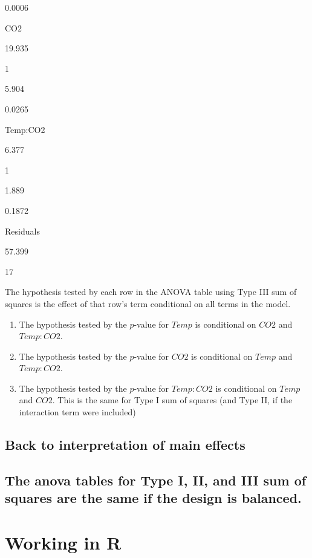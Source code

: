 \documentclass[]{book}
\begin{document}
0.0006

CO2

19.935

1

5.904

0.0265

Temp:CO2

6.377

1

1.889

0.1872

Residuals

57.399

17

The hypothesis tested by each row in the ANOVA table using Type III sum of squares is the effect of that row's term conditional on all terms in the model.

\begin{enumerate}
\def\labelenumi{\arabic{enumi}.}
\item
  The hypothesis tested by the \(p\)-value for \(Temp\) is conditional on \(CO2\) and \(Temp:CO2\).
\item
  The hypothesis tested by the \(p\)-value for \(CO2\) is conditional on \(Temp\) and \(Temp:CO2\).
\item
  The hypothesis tested by the \(p\)-value for \(Temp:CO2\) is conditional on \(Temp\) and \(CO2\). This is the same for Type I sum of squares (and Type II, if the interaction term were included)
\end{enumerate}

\hypertarget{back-to-interpretation-of-main-effects}{%
\subsection{Back to interpretation of main effects}\label{back-to-interpretation-of-main-effects}}

\hypertarget{the-anova-tables-for-type-i-ii-and-iii-sum-of-squares-are-the-same-if-the-design-is-balanced.}{%
\subsection{The anova tables for Type I, II, and III sum of squares are the same if the design is balanced.}\label{the-anova-tables-for-type-i-ii-and-iii-sum-of-squares-are-the-same-if-the-design-is-balanced.}}

\hypertarget{working-in-r-4}{%
\section{Working in R}\label{working-in-r-4}}
\end{document}
